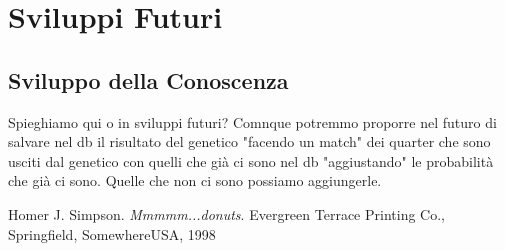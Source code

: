 \documentclass[a4paper,10pt]{article}
\begin{document}
\section{Sviluppi Futuri}
\subsection{Sviluppo della Conoscenza}
Spieghiamo qui o in sviluppi futuri? Comnque potremmo proporre nel futuro di salvare nel db 
il risultato del genetico "facendo un match" dei quarter che sono usciti dal genetico con quelli che già
ci sono nel db "aggiustando" le probabilità che già ci sono. Quelle che non ci sono possiamo aggiungerle. 

\begin{thebibliography}{50}
   Homer J. Simpson. \textsl{Mmmmm...donuts}.
		Evergreen Terrace Printing Co., Springfield, SomewhereUSA, 1998
\end{thebibliography}
\end{document}
